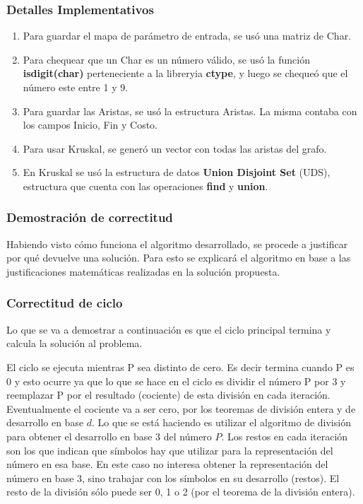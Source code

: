 	\subsubsection{Detalles Implementativos}\label{ej2_det}
		\begin{enumerate}
			\item{
				Para guardar el mapa de parámetro de entrada, se usó una matriz de Char.
			}
			\item{
				Para chequear que un Char es un número válido, se usó la función \textbf{isdigit(char)} perteneciente a la libreryia \textbf{ctype}, y luego se chequeó que el número este entre 1 y 9.
			}
			\item{
				Para guardar las Aristas, se usó la estructura Aristas. La misma contaba con los campos Inicio, Fin y Costo.
			}
			\item{
				Para usar Kruskal, se generó un vector con todas las aristas del grafo.
			}
			\item{
				En Kruskal se usó la estructura de datos \textbf{Union Disjoint Set} (UDS), estructura que cuenta con las operaciones \textbf{find} y \textbf{union}.
			}
		\end{enumerate}


	\subsubsection{Demostración de correctitud}

	Habiendo visto cómo funciona el algoritmo desarrollado, se procede a
	justificar por qué devuelve una solución. Para esto se explicará el algoritmo en base a las justificaciones matemáticas realizadas en la solución propuesta.
	\subsubsection*{Correctitud de ciclo}

	Lo que se va a demostrar a continuación es que el ciclo principal termina y calcula la solución al problema.

	El ciclo se ejecuta mientras P sea distinto de cero. Es decir termina cuando P es 0 y esto ocurre ya que lo que se hace en el ciclo es dividir el número P por 3 y reemplazar P por el resultado (cociente) de esta división en cada iteración. Eventualmente el cociente va a ser cero, por los teoremas de división entera y de desarrollo en base $d$. Lo que se está haciendo es utilizar el algoritmo de división para obtener el desarrollo en base 3 del número $P$. Los restos en cada iteración son los que indican que símbolos hay que utilizar para la representación del número en esa base. En este caso no interesa obtener la representación del número en base 3, sino trabajar con los símbolos en su desarrollo (restos). El resto de la división sólo puede ser 0, 1 o 2 (por el teorema de la división entera).

